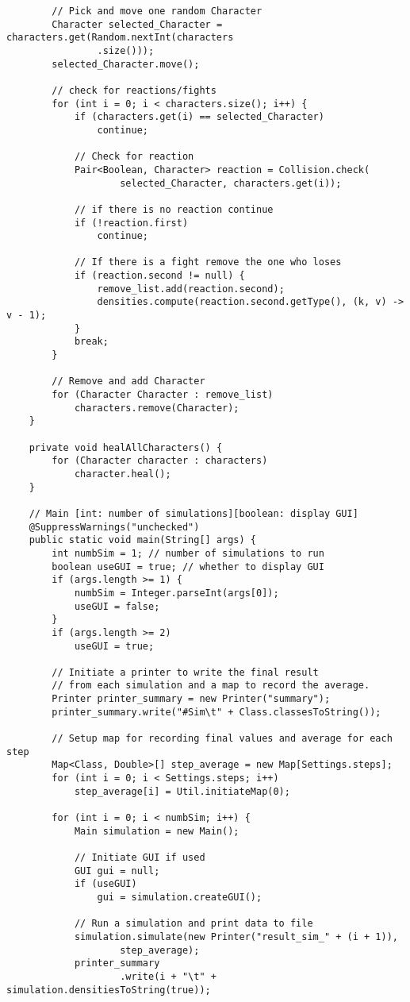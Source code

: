 \documentclass[a4paper,12pt]{article}
\begin{document}
\begin{lstlisting}
		// Pick and move one random Character
		Character selected_Character = characters.get(Random.nextInt(characters
				.size()));
		selected_Character.move();

		// check for reactions/fights
		for (int i = 0; i < characters.size(); i++) {
			if (characters.get(i) == selected_Character)
				continue;

			// Check for reaction
			Pair<Boolean, Character> reaction = Collision.check(
					selected_Character, characters.get(i));

			// if there is no reaction continue
			if (!reaction.first)
				continue;

			// If there is a fight remove the one who loses
			if (reaction.second != null) {
				remove_list.add(reaction.second);
				densities.compute(reaction.second.getType(), (k, v) -> v - 1);
			}
			break;
		}

		// Remove and add Character
		for (Character Character : remove_list)
			characters.remove(Character);
	}

	private void healAllCharacters() {
		for (Character character : characters)
			character.heal();
	}

	// Main [int: number of simulations][boolean: display GUI]
	@SuppressWarnings("unchecked")
	public static void main(String[] args) {
		int numbSim = 1; // number of simulations to run
		boolean useGUI = true; // whether to display GUI
		if (args.length >= 1) {
			numbSim = Integer.parseInt(args[0]);
			useGUI = false;
		}
		if (args.length >= 2)
			useGUI = true;

		// Initiate a printer to write the final result
		// from each simulation and a map to record the average.
		Printer printer_summary = new Printer("summary");
		printer_summary.write("#Sim\t" + Class.classesToString());

		// Setup map for recording final values and average for each step
		Map<Class, Double>[] step_average = new Map[Settings.steps];
		for (int i = 0; i < Settings.steps; i++)
			step_average[i] = Util.initiateMap(0);

		for (int i = 0; i < numbSim; i++) {
			Main simulation = new Main();

			// Initiate GUI if used
			GUI gui = null;
			if (useGUI)
				gui = simulation.createGUI();

			// Run a simulation and print data to file
			simulation.simulate(new Printer("result_sim_" + (i + 1)),
					step_average);
			printer_summary
					.write(i + "\t" + simulation.densitiesToString(true));


\end{lstlisting}
\end{document}
